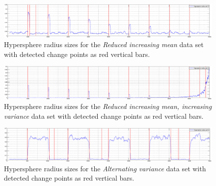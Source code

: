 \begin{figure}
\centering
  \includegraphics[width=1\textwidth]{./Figures/chapter5/set_2_results.eps}
  \caption[Reduced increasing mean, thresholds]{Hypersphere radius sizes for the \emph{Reduced increasing mean} data set with detected change points as red vertical bars.}
  \label{fig:takeuchi_reduced_increasing_mean_thresholds}
\end{figure}

\begin{figure}
\centering
  \includegraphics[width=1\textwidth]{./Figures/chapter5/set_3_results.eps}
  \caption[Reduced increasing mean, increasing variance, thresholds]{Hypersphere radius sizes for the \emph{Reduced increasing mean, increasing variance} data set with detected change points as red vertical bars.}
  \label{fig:camci_reduced_increasing_mean_increasing_variance_thresholds}
\end{figure}

\begin{figure}
\centering
  \includegraphics[width=1\textwidth]{./Figures/chapter5/set_4_results.eps}
  \caption[Alternating variance, thresholds]{Hypersphere radius sizes for the \emph{Alternating variance} data set with detected change points as red vertical bars.}
  \label{fig:camci_takeuchi_alternating_variance_thresholds}
\end{figure}
